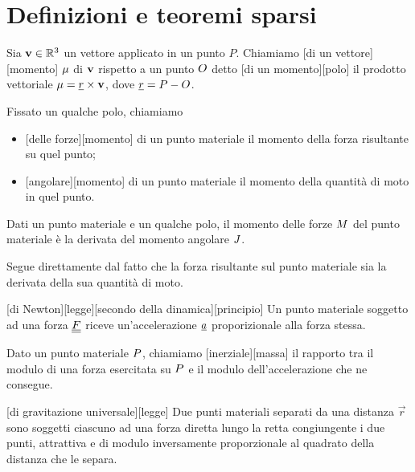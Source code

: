\section{Definizioni e teoremi sparsi}
\label{MeccanicaClassica_DefinizioniETeoremiSparsi}
\begin{Definition}
	Sia $\mathbf{v} \in \mathbb{R}^3$ un vettore applicato in un punto $P$. Chiamiamo [di un vettore][momento] $\mu$ di $\mathbf{v}$ rispetto a un punto $O$ detto [di un momento][polo] il prodotto vettoriale $\mu = \underline{r} \times \mathbf{v}$, dove $\underline{r} = P - O$.
\end{Definition}
\begin{Definition}
	Fissato un qualche polo, chiamiamo
	\begin{itemize}
		\item {}[delle forze][momento] di un punto materiale il momento della forza risultante su quel punto;
		\item {}[angolare][momento] di un punto materiale il momento della quantit\`a di moto in quel punto.
	\end{itemize}
\end{Definition}
\begin{Theorem}
	Dati un punto materiale e un qualche polo, il momento delle forze $M$ del punto materiale \`e la derivata del momento angolare $J$.
\end{Theorem}
\Proof Segue direttamente dal fatto che la forza risultante sul punto materiale sia la derivata della sua quantit\`a di moto. \EndProof
\begin{Axiom}
	[di Newton][legge][secondo della dinamica][principio] Un punto materiale soggetto ad una forza $\underline{\underline{F}}$ riceve un'accelerazione $\underline{a}$ proporizionale alla forza stessa.
\end{Axiom}
\begin{Definition}
	Dato un punto materiale $P$, chiamiamo [inerziale][massa] il rapporto tra il modulo di una forza esercitata su $P$ e il modulo dell'accelerazione che ne consegue.
\end{Definition}
\begin{Axiom}
	[di gravitazione universale][legge] Due punti materiali separati da una distanza $\vec{r}$ sono soggetti ciascuno ad una forza diretta lungo la retta congiungente i due punti, attrattiva e di modulo inversamente proporzionale al quadrato della distanza che le separa.
\end{Axiom}
